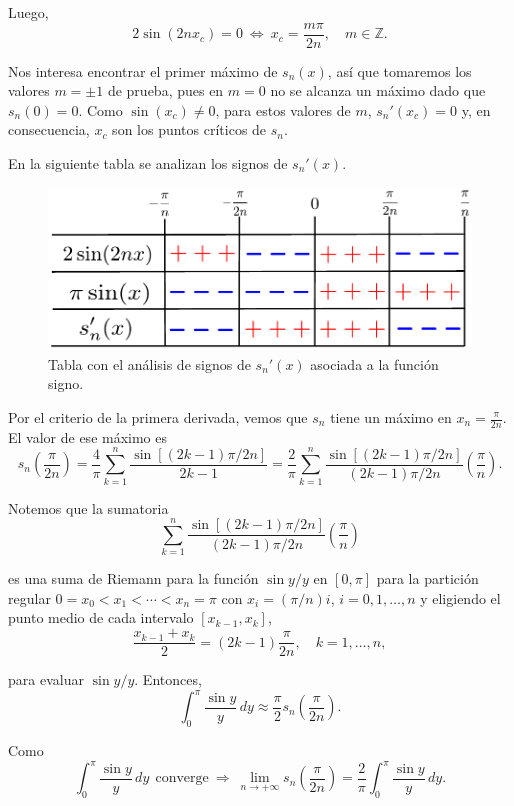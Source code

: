 Luego, 
\begin{equation*}
  2 \sin(2nx_c) = 0 ~\Leftrightarrow~ x_c = \frac{m \pi}{2n}, \quad m \in \mathbb{Z}. 
\end{equation*}

Nos interesa encontrar el primer máximo de $s_n(x)$, así que tomaremos los valores $m = \pm 1$ de prueba, pues en $m = 0$ no se alcanza un máximo dado que $s_n(0) = 0$. Como $\sin(x_c) \neq 0$, para estos valores de $m$,  $s_n'(x_c) = 0$ y, en consecuencia, $x_c$ son los puntos críticos de $s_n$. 

En la siguiente tabla se analizan los signos de $s_n'(x)$.

\begin{figure}[H]
    \centering
    \includegraphics[scale = 0.62]{Figuras/EjemploGibbs.pdf}
    \caption{Tabla con el análisis de signos de $s_n'(x)$ asociada a la función signo.}
\end{figure}

Por el criterio de la primera derivada, vemos que $s_n$ tiene un máximo en $x_n = \frac{\pi}{2n}$. El valor de ese máximo es
$$s_n \left( \frac{\pi}{2n}\right) = \frac{4}{\pi} \sum_{k=1}^n \frac{\sin[(2k-1)\pi/2n]}{2k-1} = \frac{2}{\pi} \sum_{k=1}^n \frac{\sin[(2k-1)\pi /2n]}{(2k-1) \pi/2n} \left(\frac{\pi}{n} \right).$$

Notemos que la sumatoria 
$$ \sum_{k=1}^n \frac{\sin[(2k-1)\pi /2n]}{(2k-1) \pi/2n} \left(\frac{\pi}{n} \right)$$

es una suma de Riemann para la función $\sin y/y$ en $[0,\pi]$ para la partición regular $0 = x_0 < x_1  <  \cdots< x_n =  \pi$ con $x_i = (\pi/n) i$, $i = 0,1, \dots, n$ y eligiendo el punto medio de cada intervalo $[x_{k-1},x_k]$,
$$ \frac{x_{k-1} + x_k}{2} = (2k-1) \frac{\pi}{2n}, \quad  k = 1, \dots, n,$$

para evaluar $\sin y/y$. Entonces, 
$$\int_0^{\pi} \frac{\sin y}{y} \,dy \approx \frac{\pi}{2} s_n\left( \frac{\pi}{2n}\right).$$

Como 
$$\int_0^{\pi} \frac{\sin y}{y} \,dy ~~ \mbox{converge} ~\Rightarrow~ \lim_{n \to + \infty} s_n\left( \frac{\pi}{2n} \right) = \frac{2}{\pi} \int_0^{\pi} \frac{\sin y}{y} \,dy.$$

